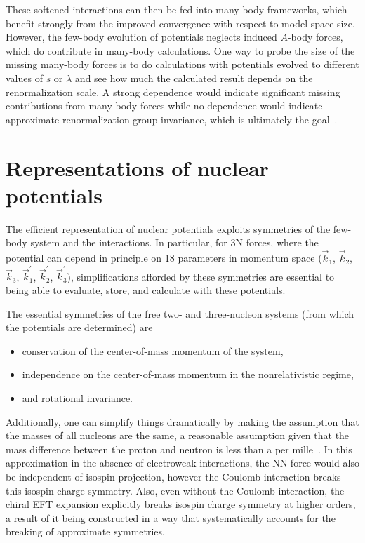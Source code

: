 These softened interactions can then be fed into many-body frameworks,
which benefit strongly from the improved convergence with respect to model-space size.
However, the few-body evolution of potentials neglects induced $A$-body forces,
which do contribute in many-body calculations.
One way to probe the size of the missing many-body forces is to do calculations
with potentials evolved to different values of $s$ or $\lambda$
and see how much the calculated result depends on the renormalization scale.
A strong dependence would indicate significant missing contributions from many-body forces
while no dependence would indicate approximate renormalization group invariance,
which is ultimately the goal~\cite{Bogn09vlowk}.

\section{Representations of nuclear potentials}

The efficient representation of nuclear potentials exploits symmetries of the few-body system and the interactions.
In particular, for 3N forces,
where the potential can depend in principle on 18 parameters in momentum space
($\vec{k}_1$, $\vec{k}_2$, $\vec{k}_3$, $\vec{k}_{1}^{\prime}$, $\vec{k}_{2}^{\prime}$, $\vec{k}_{3}^{\prime}$),
simplifications afforded by these symmetries are essential
to being able to evaluate, store, and calculate with these potentials.

The essential symmetries of the free two- and three-nucleon systems
(from which the potentials are determined)
are~\cite{Hebe20habi}
\begin{itemize}
  \item conservation of the center-of-mass momentum of the system,
  \item independence on the center-of-mass momentum in the nonrelativistic regime,
  \item and rotational invariance.
\end{itemize}
Additionally, one can simplify things dramatically by making the assumption that the masses of all nucleons are the same,
a reasonable assumption given that the mass difference between the proton and neutron is less than a per mille~\cite{Hebe20habi}.
In this approximation in the absence of electroweak interactions,
the NN force would also be independent of isospin projection,
however the Coulomb interaction breaks this isospin charge symmetry.
Also, even without the Coulomb interaction,
the chiral EFT expansion explicitly breaks isospin charge symmetry at higher orders,
a result of it being constructed in a way
that systematically accounts for the breaking of approximate symmetries.

